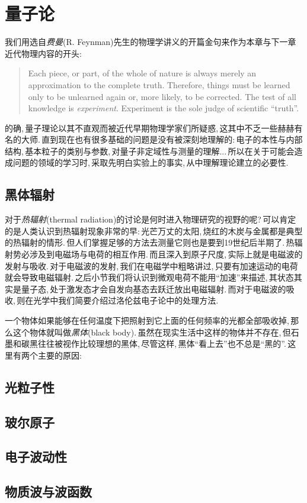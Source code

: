 \chapter{量子论}

我们用选自\emph{费曼}(R. Feynman)先生的物理学讲义的开篇金句来作为本章与下一章近代物理内容的开头:
\begin{quote}
Each piece, or part, of the whole of nature is always merely an approximation to the complete truth. Therefore, things must be learned only to be unlearned again or, more likely, to be corrected. The test of all knowledge is \emph{experiment}. Experiment is the sole judge of scientific ``truth''.
\end{quote}

的确,\,量子理论以其不直观而被近代早期物理学家们所疑惑,\,这其中不乏一些赫赫有名的大师.\,直到现在也有很多基础的问题是没有被深刻地理解的:\,电子的本性与内部结构,\,基本粒子的类别与参数,\,对量子非定域性与测量的理解...\,所以在关于可能会造成问题的领域的学习时,\,采取先明白实验上的事实,\,从中理解理论建立的必要性.


\section{黑体辐射}

对于\emph{热辐射}(thermal radiation)的讨论是何时进入物理研究的视野的呢?\,可以肯定的是人类认识到热辐射现象非常的早:\,光芒万丈的太阳,\,烧红的木炭与金属都是典型的热辐射的情形.\,但人们掌握足够的方法去测量它则也是要到19世纪后半期了.\,热辐射势必涉及到电磁场与电荷的相互作用.\,而且深入到原子尺度,\,实际上就是电磁波的发射与吸收.\,对于电磁波的发射,\,我们在电磁学中粗略讲过,\,只要有加速运动的电荷就会导致电磁辐射.\,之后小节我们将认识到微观电荷不能用``加速''来描述,\,其状态其实是量子态,\,处于激发态才会自发向基态去跃迁放出电磁辐射.\,而对于电磁波的吸收,\,则在光学中我们简要介绍过洛伦兹电子论中的处理方法.\,

一个物体如果能够在任何温度下把照射到它上面的任何频率的光都全部吸收掉,\,那么这个物体就叫做\emph{黑体}(black body).\,虽然在现实生活中这样的物体并不存在,\,但石墨和碳黑往往被视作比较理想的黑体,\,尽管这样,\,黑体``看上去''也不总是``黑的''.\,这里有两个主要的原因:




\section{光粒子性}

\section{玻尔原子}

\section{电子波动性}

\section{物质波与波函数}

